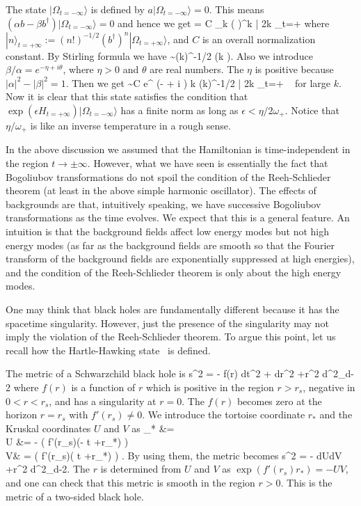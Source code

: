 \documentclass[12pt,a4paper]{article}
\theoremstyle{plain}
\theoremstyle{definition}
\numberwithin{thm}{section}
\newcommand{\ket}[1]{ | {#1} \rangle }
\def\beq#1\eeq{\begin{align}#1\end{align}}
\begin{document}
The state $\ket{\Omega_{t=-\infty}}$ is defined by
$
a \ket{\Omega_{t=-\infty}} =0.
$
This means $(\alpha b - \beta b^\dagger) \ket{\Omega_{t=-\infty}} =0$ and hence we get
\beq
\ket{\Omega_{t=-\infty}} = C \sum_{k }\left( \frac{\beta}{\alpha} \right)^k  \cdot \ket{2k}_{t=+\infty} \label{eq:transf}
\eeq
where 
$
\ket{n}_{t=+\infty}:=  (n!)^{-1/2} (b^\dagger)^{n}\ket{\Omega_{t=+\infty}} 
$, and 
$C$ is an overall normalization constant. 
By Stirling formula we have
\beq
\sqrt{\frac{(2k)!}{2^{2k}(k!)^2}}  \sim  (\pi k)^{-1/2} \qquad (k ).
\eeq
Also we introduce
$
\beta / \alpha= e^{- \eta + i \theta} 
$,
where $\eta>0$ and $\theta$ are real numbers. The $\eta$ is positive because $|\alpha|^2 - |\beta|^2=1$.
Then we get
\beq
\ket{\Omega_{t=-\infty}} \sim C \sum  e^{ (- \eta  + i \theta) k}  (\pi k)^{-1/2} \ket{2k}_{t=+\infty} \
\eeq
for large $k$. Now it is clear that this state satisfies the condition that $\exp( \epsilon H_{t=+\infty} ) \ket{\Omega_{t=-\infty}}$
has a finite norm as long as $\epsilon < \eta/2\omega_+$. Notice that $\eta/\omega_+$ is like an inverse temperature in a rough sense.

In the above discussion we assumed that the Hamiltonian is time-independent in the region $t \to \pm \infty$.
However, what we have seen is essentially the fact that Bogoliubov transformations do not spoil the condition of the Reeh-Schlieder theorem
(at least in the above simple harmonic oscillator). The effects of backgrounds are that, intuitively speaking, we have successive Bogoliubov transformations
as the time evolves.
We expect that this is a general feature. An intuition is that the background fields affect low energy modes but not high energy modes
(as far as the background fields are smooth so that the Fourier transform of the background fields are exponentially suppressed at high energies), and
the condition of the Reeh-Schlieder theorem is only about the high energy modes.

One may think that black holes are fundamentally different because it has the spacetime singularity.
However, just the presence of the singularity may not imply the violation of the Reeh-Schlieder theorem.
To argue this point, let us recall how the Hartle-Hawking state~\cite{Hartle:1976tp} is defined.

The metric of a Schwarzchild black hole is 
\beq
ds^2 = - f(r) dt^2 +  dr^2 +r^2 d\Omega^2_{d-2}
\eeq
where $f(r)$ is a function of $r$ which is positive in the region $r>r_s$, negative in $0<r<r_s$, and has a singularity at $r=0$.
The $f(r)$ becomes zero at the horizon $r=r_s$ with $f'(r_s) \neq 0$.
We introduce the tortoise coordinate $r_*$ and the Kruskal coordinates $U$ and $V$ as
\beq
r_* &=  \int {}  \\
U &= - \exp \left(   f'(r_s)(- t +r_*) \right) \\
V&  =  \exp \left( \frac{1}{2} f'(r_s)( t +r_*) \right) .
\eeq
By using them, the metric becomes
\beq
ds^2 = -  dUdV +r^2 d\Omega^2_{d-2}.
\eeq
The $r$ is determined from $U$ and $V$ as $\exp(f'(r_s)r_*)=-UV$, and one can check that this metric is smooth in the region $r>0$.
This is the metric of a two-sided black hole.
\end{document}
